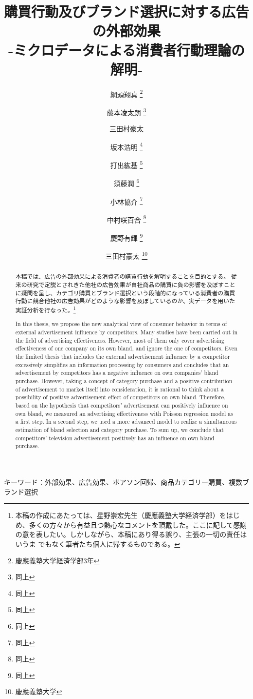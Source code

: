 \documentclass[11pt]{jsarticle}
\title{購買行動及びブランド選択に対する広告の外部効果\\-ミクロデータによる消費者行動理論の解明-}
\author{網頭翔真 \thanks{慶應義塾大学経済学部3年} \and 藤本凌太朗 \thanks{同上} \and 三田村豪太  \and 坂本浩明 \thanks{同上} \and 打出紘基 \thanks{同上} \\ \and 須藤潤 \thanks{同上} \and 小林協介 \thanks{同上} \and 中村咲百合 \thanks{同上} \and 慶野有輝 \thanks{同上}\and 三田村豪太 \thanks{慶應義塾大学}}
\begin{document}
\maketitle

 \thispagestyle{empty}

\begin{abstract}
本稿では、広告の外部効果による消費者の購買行動を解明することを目的とする。
従来の研究で定説とされきた他社の広告効果が自社商品の購買に負の影響を及ぼすことに疑問を呈し、カテゴリ購買とブランド選択という段階的になっている消費者の購買行動に競合他社の広告効果がどのような影響を及ぼしているのか、実データを用いた実証分析を行なった。\footnote{  本稿の作成にあたっては、星野崇宏先生（慶應義塾大学経済学部）をはじめ、多くの方々から有益且つ熱心なコメントを頂戴した。ここに記して感謝の意を表したい。しかしながら、本稿にあり得る誤り、主張の一切の責任はいうま でもなく筆者たち個人に帰するものである。}

In this thesis, we propose the new analytical view of consumer behavior in terms of external advertisement influence by competitors. Many studies have been carried out in the field of advertising effectiveness. However, most of them only cover advertising effectiveness of one company on its own bland, and ignore the one of competitors. Even the limited thesis that includes the external advertisement influence by a competitor excessively simplifies an information processing by consumers and concludes that an advertisement by competitors has a negative influence on own companies’ bland purchase. However, taking a concept of category purchase and a positive contribution of advertisement to market itself  into consideration, it is rational to think about a possibility of positive advertisement effect of competitors on own bland. Therefore, based on the hypothesis that competitors’ advertisement can positively influence on own bland, we measured an advertising effectiveness with Poisson regression model as a first step. In a second step, we used a more advanced model to realize a simultaneous estimation of bland selection and category purchase. To sum up, we conclude that competitors’ television advertisement positively has an influence on own bland purchase.
\end{abstract}

\begin{center}
キーワード：外部効果、広告効果、ポアソン回帰、商品カテゴリー購買、複数ブランド選択\\

\end{center}
\end{document}
